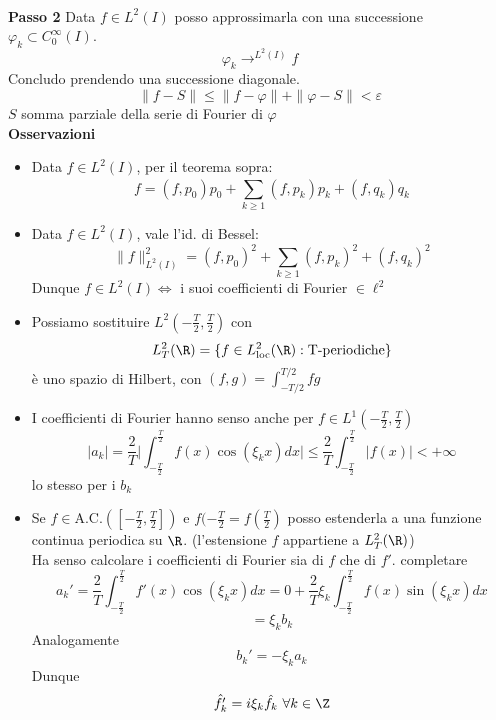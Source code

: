 \\\textbf{Passo 2} Data $f\in L^{2}(I)$ posso approssimarla con una successione $\varphi_k \subset C_0^\infty(I)$.
\[\varphi_k\rightarrow^{L^{2}(I)}f\]
Concludo prendendo una successione diagonale.
\[\|f-S\|\le \|f-\varphi\|+\|\varphi-S\|<\varepsilon\]
$S$ somma parziale della serie di Fourier di $\varphi$ 
\\\textbf{Osservazioni}
\begin{itemize}
	\item Data $f\in L^{2}(I)$, per il teorema sopra:
		\[f=(f,p_0)p_0+\sum_{k\ge 1}^{} (f,p_k)p_k+(f,q_k)q_k\]
	\item Data $f\in L^{2}(I)$, vale l'id. di Bessel:
		\[\|f\|_{L^{2}(I)}^2=(f,p_0)^2+\sum_{k\ge 1}^{} (f,p_k)^2+(f,q_k)^2\]
		Dunque $f\in L^{2}(I) \iff $ i suoi coefficienti di Fourier $\in \ell^2$ 
	\item Possiamo sostituire $L^{2}(-\frac{T}{2},\frac{T}{2})$ con 
		\[ L^{2}_T(\R)=\{f\in L_{\text{loc}}^2(\R):\text{T-periodiche}\} \]
		è uno spazio di Hilbert, con $(f,g)=\int_{-T / 2}^{T / 2} fg $ 
	\item I coefficienti di Fourier hanno senso anche per $f\in L^{1}(-\frac{T}{2},\frac{T}{2})$ 
		\[|a_k|=\frac{2}{T}\bigg|\int_{-\frac{T}{2}}^{\frac{T}{2}}f(x)\cos(\xi_kx)dx\bigg|\le \frac{2}{T } \int_{-\frac{T}{2}}^{\frac{T}{2}} |f(x)|<+\infty\]
		lo stesso per i $b_k$ 
	\item Se $f\in \text{A.C.}([-\frac{T}{2},\frac{T}{2}])$ e $f(-\frac{T}{2}=f(\frac{T}{2})$ posso estenderla a una funzione continua periodica su $\R$. (l'estensione $f$ appartiene a $L_T^2(\R)$)
		\\Ha senso calcolare i coefficienti di Fourier sia di $f$ che di $f'$.
		completare
\[a_k'=\frac{2}{T} \int_{-\frac{T}{2}}^{\frac{T}{2}} f'(x)\cos(\xi_kx)dx=0+\frac{2}{T}\xi_k \int_{-\frac{T}{2}}^{\frac{T}{2}} f(x)\sin(\xi_kx)dx\]
\[=\xi_kb_k\]
Analogamente
\[b_k'=-\xi_ka_k\]
Dunque
\[\hat{f_k'}=i\xi_k \hat{f_k}\ \forall k\in \Z\]

\end{itemize}
